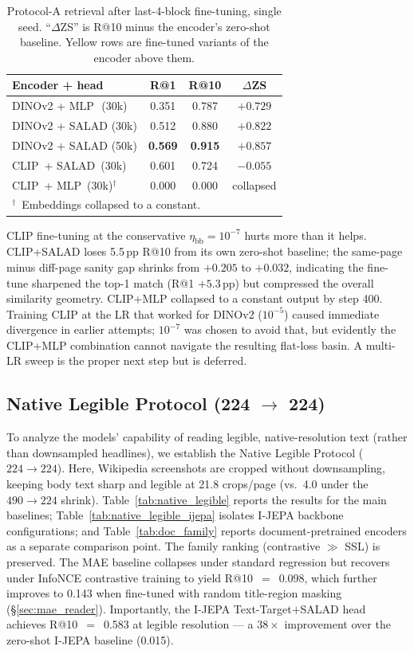 \documentclass{article}
\begin{document}
\begin{table}[t]
\caption{Protocol-A retrieval after last-4-block fine-tuning, single
seed. ``$\Delta$ZS'' is R@10 minus the encoder's zero-shot baseline.
Yellow rows are fine-tuned variants of the encoder above them.}
\label{tab:finetune}
\centering
\small
\begin{tabular}{lccc}
\toprule
Encoder + head & R@1 & R@10 & $\Delta$ZS \\
\midrule
\rowcolor{cFT}  DINOv2 + MLP \,\,(30k)    & 0.351 & 0.787 & $+0.729$ \\
\rowcolor{cFT}  DINOv2 + SALAD (30k)      & 0.512 & 0.880 & $+0.822$ \\
\rowcolor{cFT}  DINOv2 + SALAD (50k)      & \textbf{0.569} & \textbf{0.915} & $+0.857$ \\
\rowcolor{cFT}  CLIP\, + SALAD\, (30k)     & 0.601 & 0.724 & $-0.055$ \\
\rowcolor{cFT}  CLIP\, + MLP\, (30k)$^\dagger$ & 0.000 & 0.000 & collapsed \\
\bottomrule
\multicolumn{4}{l}{\footnotesize $^\dagger$~Embeddings collapsed to
a constant.}
\end{tabular}
\end{table}

CLIP fine-tuning at the conservative $\eta_{\text{bb}}=10^{-7}$
hurts more than it helps. CLIP+SALAD loses 5.5\,pp R@10 from its
own zero-shot baseline; the same-page minus diff-page sanity gap
shrinks from $+0.205$ to $+0.032$, indicating the fine-tune
sharpened the top-1 match (R@1 $+5.3$\,pp) but compressed the
overall similarity geometry. CLIP+MLP collapsed to a constant
output by step 400. Training CLIP at the LR that worked for
DINOv2 ($10^{-5}$) caused immediate divergence in earlier
attempts; $10^{-7}$ was chosen to avoid that, but evidently the
CLIP+MLP combination cannot navigate the resulting flat-loss
basin. A multi-LR sweep is the proper next step but is deferred.

\subsection{Native Legible Protocol (224 $\to$ 224)}
\label{sec:native_legible}

To analyze the models' capability of reading legible, native-resolution text (rather than downsampled headlines), we establish the Native Legible Protocol ($224 \to 224$). Here, Wikipedia screenshots are cropped without downsampling, keeping body text sharp and legible at 21.8 crops/page (vs.\ 4.0 under the $490{\to}224$ shrink). Table~\ref{tab:native_legible} reports the results for the main baselines; Table~\ref{tab:native_legible_ijepa} isolates I-JEPA backbone configurations; and Table~\ref{tab:doc_family} reports document-pretrained encoders as a separate comparison point. The family ranking (contrastive $\gg$ SSL) is preserved. The MAE baseline \cite{he2022mae} collapses under standard regression but recovers under InfoNCE contrastive training to yield R@10~$=$~0.098, which further improves to 0.143 when fine-tuned with random title-region masking (\S\ref{sec:mae_reader}). Importantly, the I-JEPA Text-Target$+$SALAD head achieves R@10~$=$~0.583 at legible resolution --- a $38\times$ improvement over the zero-shot I-JEPA baseline (0.015).
\end{document}

